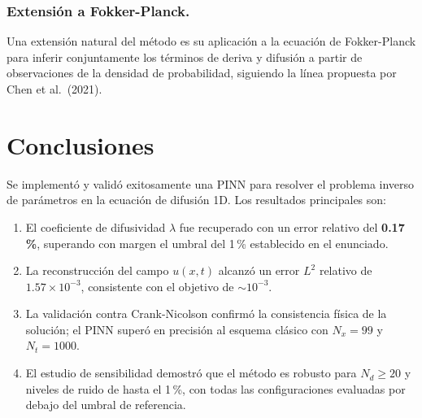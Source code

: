 \documentclass[12pt,a4paper]{article}
\begin{document}
\subsubsection*{Extensión a Fokker-Planck.}
Una extensión natural del método es su aplicación a la ecuación de Fokker-Planck para
inferir conjuntamente los términos de deriva y difusión a partir de observaciones de la
densidad de probabilidad, siguiendo la línea propuesta por Chen et al.\ (2021).

\section{Conclusiones}

Se implementó y validó exitosamente una PINN para resolver el problema inverso de
parámetros en la ecuación de difusión 1D. Los resultados principales son:

\begin{enumerate}
  \item El coeficiente de difusividad $\lambda$ fue recuperado con un error relativo del
        \textbf{0.17\,\%}, superando con margen el umbral del 1\,\% establecido en el
        enunciado.
  \item La reconstrucción del campo $u(x,t)$ alcanzó un error $L^2$ relativo de
        $1.57\times10^{-3}$, consistente con el objetivo de $\sim10^{-3}$.
  \item La validación contra Crank-Nicolson confirmó la consistencia física de la
        solución; el PINN superó en precisión al esquema clásico con $N_x=99$ y
        $N_t=1000$.
  \item El estudio de sensibilidad demostró que el método es robusto para
        $N_d\geq20$ y niveles de ruido de hasta el 1\,\%, con todas las configuraciones
        evaluadas por debajo del umbral de referencia.
\end{enumerate}
\end{document}
